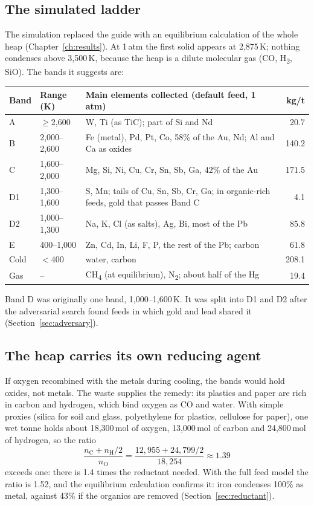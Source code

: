 \documentclass[11pt,a4paper]{article}
\begin{document}
\subsection{The simulated ladder}
The simulation replaced the guide with an equilibrium calculation of the whole heap (Chapter~\ref{ch:results}). At 1\,atm the first solid appears at 2,875\,K; nothing condenses above 3,500\,K, because the heap is a dilute molecular gas (CO, H\textsubscript{2}, SiO). The bands it suggests are:

\begin{center}
\small
\begin{tabular}{@{}l l >{\raggedright\arraybackslash}p{8.2cm} r@{}}
\toprule
\textbf{Band} & \textbf{Range (K)} & \textbf{Main elements collected (default feed, 1\,atm)} & \textbf{kg/t} \\
\midrule
A & $\ge$2,600 & W, Ti (as TiC); part of Si and Nd & 20.7 \\
B & 2,000--2,600 & Fe (metal), Pd, Pt, Co, 58\% of the Au, Nd; Al and Ca as oxides & 140.2 \\
C & 1,600--2,000 & Mg, Si, Ni, Cu, Cr, Sn, Sb, Ga, 42\% of the Au & 171.5 \\
D1 & 1,300--1,600 & S, Mn; tails of Cu, Sn, Sb, Cr, Ga; in organic-rich feeds, gold that passes Band C & 4.1 \\
D2 & 1,000--1,300 & Na, K, Cl (as salts), Ag, Bi, most of the Pb & 85.8 \\
E & 400--1,000 & Zn, Cd, In, Li, F, P, the rest of the Pb; carbon & 61.8 \\
Cold & $<$400 & water, carbon & 208.1 \\
Gas & -- & CH\textsubscript{4} (at equilibrium), N\textsubscript{2}; about half of the Hg & 19.4 \\
\bottomrule
\end{tabular}
\end{center}

Band D was originally one band, 1,000--1,600\,K. It was split into D1 and D2 after the adversarial search found feeds in which gold and lead shared it (Section~\ref{sec:adversary}).

\subsection{The heap carries its own reducing agent}
If oxygen recombined with the metals during cooling, the bands would hold oxides, not metals. The waste supplies the remedy: its plastics and paper are rich in carbon and hydrogen, which bind oxygen as CO and water. With simple proxies (silica for soil and glass, polyethylene for plastics, cellulose for paper), one wet tonne holds about 18,300\,mol of oxygen, 13,000\,mol of carbon and 24,800\,mol of hydrogen, so the ratio
\[
\frac{n_{\mathrm C} + n_{\mathrm H}/2}{n_{\mathrm O}} = \frac{12{,}955 + 24{,}799/2}{18{,}254}\approx 1.39
\]
exceeds one: there is 1.4 times the reductant needed. With the full feed model the ratio is 1.52, and the equilibrium calculation confirms it: iron condenses 100\% as metal, against 43\% if the organics are removed (Section~\ref{sec:reductant}).
\end{document}
